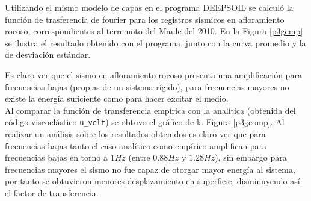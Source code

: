 Utilizando el mismo modelo de capas en el programa DEEPSOIL se calculó la función de trasferencia de fourier para los registros sísmicos en afloramiento rocoso, correspondientes al terremoto del Maule del 2010. En la Figura \ref{p3gemp} se ilustra el resultado obtenido con el programa, junto con la curva promedio y la de desviación estándar.


Es claro ver que el sismo en afloramiento rocoso presenta una amplificación para frecuencias bajas (propias de un sistema rígido), para frecuencias mayores no existe la energía suficiente como para hacer excitar el medio. \\

Al comparar la función de transferencia empírica con la analítica (obtenida del código viscoelástico \texttt{u\_velt}) se obtuvo el gráfico de la Figura \ref{p3gcomp}. Al realizar un análisis sobre los resultados obtenidos es claro ver que para frecuencias bajas tanto el caso analítico como empírico amplifican para frecuencias bajas en torno a $1Hz$ (entre $0.88Hz$ y $1.28Hz$), sin embargo para frecuencias mayores el sismo no fue capaz de otorgar mayor energía al sistema, por tanto se obtuvieron menores desplazamiento en superficie, disminuyendo así el factor de transferencia.

